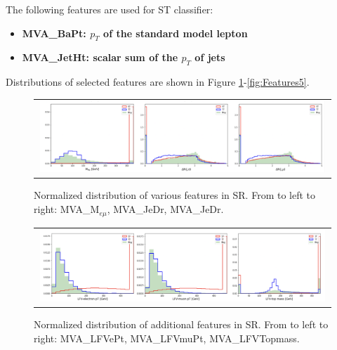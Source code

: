 The following features are used for ST classifier:

\begin{itemize}
\item \textbf{MVA\_BaPt: $p_T$ of the standard model lepton}
\item \textbf{MVA\_JetHt: scalar sum of the $p_T$ of jets}
\end{itemize}

Distributions of selected features are shown in Figure \ref{fig:Features1}-\ref{fig:Features5}.

\begin{figure}[tbh!]
 \begin{center}
 \begin{tabular}{c}
  \includegraphics[width=0.99\textwidth]{figures/Part3/BDT/Features1}\\
 \end{tabular}
 \caption{Normalized distribution of various features in SR. From to left to right: MVA\_M$_{e\mu}$, MVA\_JeDr, MVA\_JeDr.}
 \label{fig:Features1}
 \end{center}
\end{figure}

\begin{figure}[tbh!]
 \begin{center}
 \begin{tabular}{c}
  \includegraphics[width=0.99\textwidth]{figures/Part3/BDT/Features2}\\
 \end{tabular}
 \caption{Normalized distribution of additional features in SR. From to left to right: MVA\_LFVePt, MVA\_LFVmuPt, MVA\_LFVTopmass.}
 \label{fig:Features2}
 \end{center}
\end{figure}

